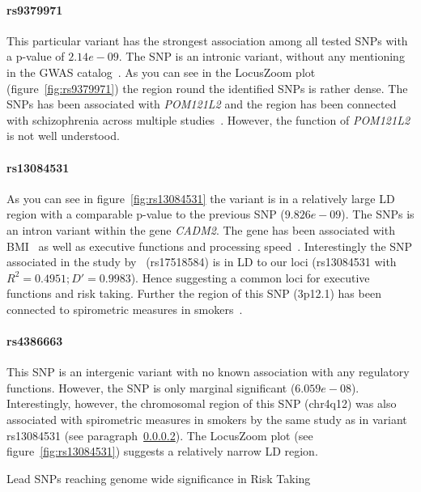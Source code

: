 \paragraph{rs9379971}
\label{par:rs9379971}
This particular variant has the strongest association among all tested SNPs with a p-value of $2.14e-09$. 
The SNP is an intronic variant, without any mentioning in the GWAS catalog~\cite{Welter2014}.
As you can see in the LocusZoom plot (figure~\ref{fig:rs9379971}) the region round the identified SNPs is rather dense. 
The SNPs has been associated with \textit{POM121L2} and the region has been connected with schizophrenia across multiple studies~\cite{Aberg2013,Shi2009}.
However, the function of \textit{POM121L2} is not well understood.

\paragraph{rs13084531}
\label{par:rs13084531}
As you can see in figure~\ref{fig:rs13084531} the variant is in a relatively large LD region with a comparable p-value to the previous SNP ($9.826e-09$).
The SNPs is an intron variant within the gene \textit{CADM2}.
The gene has been associated with BMI~\cite{Speliotes2010} as well as executive functions and processing speed~\cite{Ibrahim-Verbaas2015}.
Interestingly the SNP associated in the study by~\cite{Ibrahim-Verbaas2015} (rs17518584) is in LD to our loci (rs13084531 with $R^2=0.4951;D'=0.9983$).
Hence suggesting a common loci for executive functions and risk taking.
Further the region of this SNP (3p12.1) has been connected to spirometric measures in smokers~\cite{Lutz2015}.

\paragraph{rs4386663}
\label{par:rs4386663}
This SNP is an intergenic variant with no known association with any regulatory functions.
However, the SNP is only marginal significant ($6.059e-08$).
Interestingly, however, the chromosomal region of this SNP (chr4q12) was also associated with spirometric measures in smokers by the same study as in variant rs13084531 (see paragraph~\ref{par:rs13084531}).
The LocusZoom plot (see figure~\ref{fig:rs13084531}) suggests a relatively narrow LD region. 

\begin{table}
	\small
	\centering
	\caption{Lead SNPs reaching genome wide significance in Risk Taking}\label{tab:lead_snps_risk}
	
\end{table}


